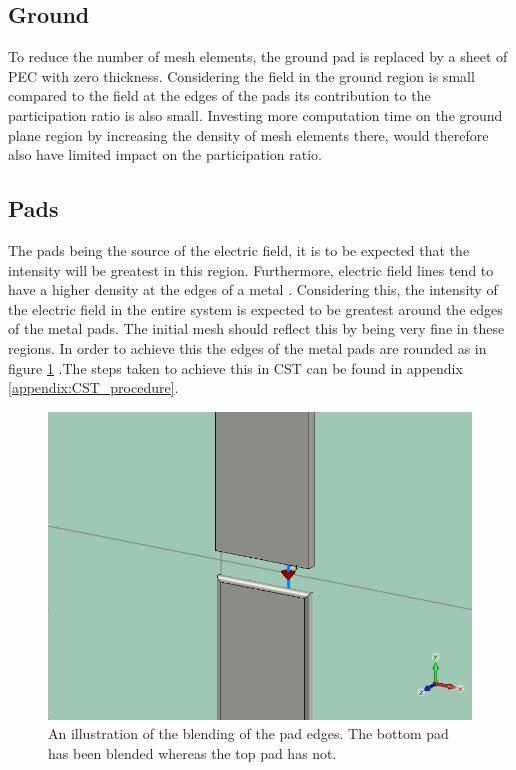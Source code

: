 \subsection{Ground}
To reduce the number of mesh elements, the ground pad is replaced by a sheet of PEC with zero thickness. Considering the field in the ground region is small compared to the field at the edges of the pads its contribution to the participation ratio is also small. Investing more computation time on the ground plane region by increasing the density of mesh elements there, would therefore also have limited impact on the participation ratio.
\subsection{Pads}
The pads being the source of the electric field, it is to be expected that the intensity will be greatest in this region. Furthermore, electric field lines tend to have a higher density at the edges of a metal . Considering this, the intensity of the electric field in the entire system is expected to be greatest around the edges of the metal pads. The initial mesh should reflect this by being very fine in these regions. In order to achieve this the edges of the metal pads are rounded as in figure \ref{fig:blending4} .The steps taken to achieve this in CST can be found in appendix \ref{appendix:CST_procedure}. 


\begin{figure}
	\centering
	\includegraphics[scale=.5]{Figures/blending4}
	\caption{An illustration of the blending of the pad edges. The bottom pad has been blended whereas the top pad has not.}
	\label{fig:blending4}
\end{figure}